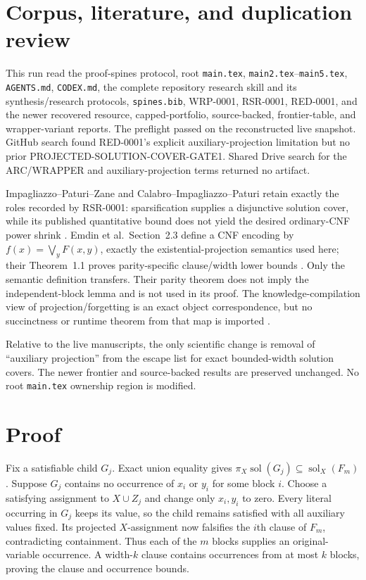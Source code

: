 \documentclass[11pt]{article}
\newcommand{\sol}{\operatorname{sol}}
\newcommand{\proj}{\pi}
\begin{document}
\section{Corpus, literature, and duplication review}
This run read the proof-spines protocol, root \texttt{main.tex},
\texttt{main2.tex}--\texttt{main5.tex}, \texttt{AGENTS.md}, \texttt{CODEX.md},
the complete repository research skill and its synthesis/research protocols,
\texttt{spines.bib}, WRP-0001, RSR-0001, RED-0001, and the newer recovered
resource, capped-portfolio, source-backed, frontier-table, and wrapper-variant
reports.  The preflight passed on the reconstructed live snapshot.  GitHub
search found RED-0001's explicit auxiliary-projection limitation but no prior
PROJECTED-SOLUTION-COVER-GATE1.  Shared Drive search for the ARC/WRAPPER and
auxiliary-projection terms returned no artifact.

Impagliazzo--Paturi--Zane and Calabro--Impagliazzo--Paturi retain exactly the
roles recorded by RSR-0001: sparsification supplies a disjunctive solution
cover, while its published quantitative bound does not yield the desired
ordinary-CNF power shrink \cite{ipz2001,calabro2010}.  Emdin et al.\
Section~2.3 define a CNF encoding by
$f(x)=\bigvee_y F(x,y)$, exactly the existential-projection semantics used
here; their Theorem~1.1 proves parity-specific clause/width lower bounds
\cite{emdin2022}.  Only the semantic definition transfers.  Their parity
theorem does not imply the independent-block lemma and is not used in its
proof.  The knowledge-compilation view of projection/forgetting is an exact
object correspondence, but no succinctness or runtime theorem from that map
is imported \cite{darwiche2002}.

Relative to the live manuscripts, the only scientific change is removal of
``auxiliary projection'' from the escape list for exact bounded-width
solution covers.  The newer frontier and source-backed results are preserved
unchanged.  No root \texttt{main.tex} ownership region is modified.

\section{Proof}
Fix a satisfiable child $G_j$.  Exact union equality gives
$\proj_X\sol(G_j)\subseteq\sol_X(F_m)$.  Suppose $G_j$ contains no occurrence
of $x_i$ or $y_i$ for some block $i$.  Choose a satisfying assignment to
$X\cup Z_j$ and change only $x_i,y_i$ to zero.  Every literal occurring in
$G_j$ keeps its value, so the child remains satisfied with all auxiliary
values fixed.  Its projected $X$-assignment now falsifies the $i$th clause of
$F_m$, contradicting containment.  Thus each of the $m$ blocks supplies an
original-variable occurrence.  A width-$k$ clause contains occurrences from
at most $k$ blocks, proving the clause and occurrence bounds.
\end{document}
